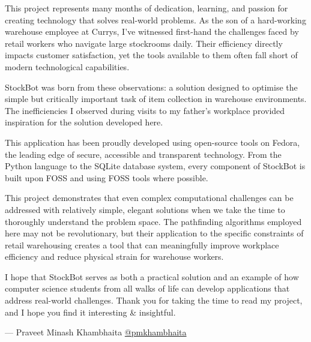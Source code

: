 
\begin{preface}      


This project represents many months of dedication, learning, and passion for creating technology that solves real-world problems. As the son of a hard-working warehouse employee at Currys, I've witnessed first-hand the challenges faced by retail workers who navigate large stockrooms daily. Their efficiency directly impacts customer satisfaction, yet the tools available to them often fall short of modern technological capabilities.

\textbf{}
\newline
StockBot was born from these observations: a solution designed to optimise the simple but critically important task of item collection in warehouse environments. The inefficiencies I observed during visits to my father's workplace provided inspiration for the solution developed here.

\textbf{}
\newline
This application has been proudly developed using open-source tools on Fedora, the leading edge of secure, accessible and transparent technology. From the Python language to the SQLite database system, every component of StockBot is built upon FOSS and using FOSS tools where possible.

\textbf{}
\newline
This project demonstrates that even complex computational challenges can be addressed with relatively simple, elegant solutions when we take the time to thoroughly understand the problem space. The pathfinding algorithms employed here may not be revolutionary, but their application to the specific constraints of retail warehousing creates a tool that can meaningfully improve workplace efficiency and reduce physical strain for warehouse workers.

\textbf{}
\newline
I hope that StockBot serves as both a practical solution and an example of how computer science students 
from all walks of life can develop applications that address real-world challenges. Thank you for taking the time to read my project, and I hope you find it interesting \& insightful.

\textbf{}
\newline
— Praveet Minash Khambhaita \newline
  \href{https://github.com/pmkhambhaita}{@pmkhambhaita}


\end{preface}
